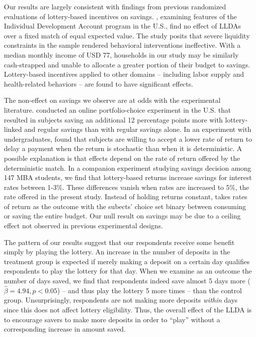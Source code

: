 \documentclass[11pt]{article}
\begin{document}
		Our results are largely consistent with findings from previous randomized evaluations of lottery-based incentives on savings. , examining features of the Individual Development Account program in the U.S., find no effect of LLDAs over a fixed match of equal expected value. The study posits that severe liquidity constraints in the sample rendered behavioral interventions ineffective. With a median monthly income of USD 77, households in our study may be similarly cash-strapped and unable to allocate a greater portion of their budget to savings. Lottery-based incentives applied to other domains -- including labor supply  and health-related behaviors  -- are found to have significant effects.

		The non-effect on savings we observe are at odds with the experimental literature.  conducted an online portfolio-choice experiment in the U.S. that resulted in subjects saving an additional 12 percentage points more with lottery-linked and regular savings than with regular savings alone. In an experiment with undergraduates,  found that subjects are willing to accept a lower rate of return to delay a payment when the return is stochastic than when it is deterministic. A possible explanation is that effects depend on the rate of return offered by the deterministic match. In a companion experiment studying savings decision among 147 MBA students, we find that lottery-based returns increase savings for interest rates between 1-3\%. These differences vanish when rates are increased to 5\%, the rate offered in the present study. Instead of holding returns constant,  takes rates of return as the outcome with the subects' choice set binary between consuming or saving the entire budget. Our null result on savings may be due to a ceiling effect not observed in previous experimental designs.

		The pattern of our results suggest that our respondents receive some benefit simply by playing the lottery. An increase in the number of deposits in the treatment group is expected if merely making a deposit on a certain day qualifies respondents to play the lottery for that day. When we examine as an outcome the number of days saved, we find that respondents indeed save almost 5 days more ($\hat \beta = 4.94, p < 0.05$) -- and thus play the lottery 5 more times -- than the control group. Unsurprisingly, respondents are not making more deposits \textit{within} days since this does not affect lottery eligibility. Thus, the overall effect of the LLDA is to encourage savers to make more deposits in order to ``play'' without a corresponding increase in amount saved. %
\end{document}
